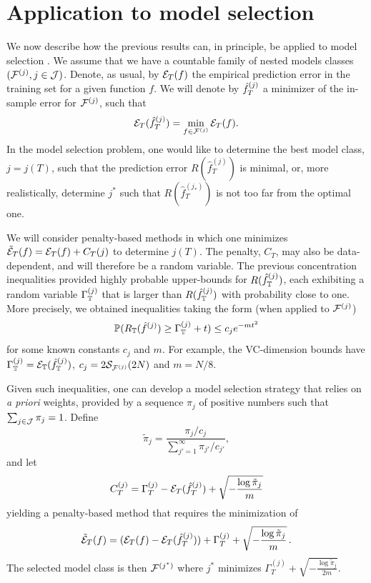 \section{Application to model selection}
We now describe how the previous results can, in principle, be applied to model selection \citep{bbl02}.
We assume that we have a countable family of nested
models classes $({\mathcal F}^{(j)}, j\in{\mathcal J})$. 
Denote, as usual, by ${\mathcal E}_T(f)$  the empirical prediction error in the training
set for a given function $f$. We will denote by ${\hat{f}}^{(j)}_T$ a minimizer of the in-sample error for ${\mathcal F}^{(j)}$, such that
\[
{\mathcal E}_T({\hat{f}}^{(j)}_T) = \min_{f\in {\mathcal F}^{(j)}} {\mathcal E}_T(f).
\]
In the model selection problem, 
one would like to determine the best model class, $j=j(T)$, such that the prediction error $R(\hat f^{(j)}_T)$ is minimal, or, more realistically, determine $j^*$ such that $R(\hat f^{(j_*)}_T)$ is not too far from the optimal one.

We will consider penalty-based methods in which one minimizes $\tilde {{\mathcal E}}_T(f) = {\mathcal E}_T(f) + C_T(j)$ to determine $j(T)$. The penalty, $C_T$, may also be data-dependent, and will therefore be a random variable. The previous concentration inequalities provided highly probable upper-bounds for
$R({\hat{f}}^{(j)}_{\mathbb T})$, each exhibiting a random variable $\Gamma_{\mathbb T}^{(j)}$ that is larger than
$R({\hat{f}}^{(j)}_{\mathbb T})$ with probability close to one. More precisely, we obtained inequalities taking the form (when applied to ${\mathcal F}^{(j)}$)
\begin{equation}
\label{eq:basic}
\bm{\mathbb P}(R_{\mathbb T}({\hat{f}}^{(j)}) \geq \Gamma_{\mathbb T}^{(j)} + t) \leq c_j e^{-mt^2}
\end{equation}
for some known constants $c_j$ and $m$. For example, the VC-dimension bounds have $\Gamma_{\mathbb T}^{(j)} = {\mathcal E}_{\mathbb T}({\hat{f}}^{(j)}_{\mathbb T})$, $c_j = 2{\mathcal S}_{{\mathcal F}^{(j)}}(2N)$ and $m = N/8$.  

Given such inequalities, one can develop a model selection strategy that relies on {\it a priori} weights, provided by a sequence $\pi_j$ of positive numbers such that $\sum_{j\in{\mathcal J}} \pi_j = 1$. Define
\[
\tilde \pi_j = \frac{\pi_j /c_j}{\sum_{j'=1}^\infty \pi_{j'}/c_{j'}},
\] 
and let
$$
C_T^{(j)} = \Gamma_T^{(j)} - {\mathcal E}_T({\hat{f}}^{(j)}_T) + \sqrt{-\frac{\log \tilde \pi_j}{m}}
$$
yielding a penalty-based method that requires the minimization of 
\[
\tilde {{\mathcal E}}_T(f) =  ({\mathcal E}_T(f) - {\mathcal E}_T({\hat{f}}^{(j)}_T)) + \Gamma_T^{(j)} + \sqrt{-\frac{\log \tilde \pi_j}{m}}\,.
\]
The selected model class is then ${\mathcal F}^{(j^*)}$ where $j^*$ minimizes  $\Gamma_T^{(j)} + \sqrt{-\frac{\log \tilde \pi_j}{2m}}$. 

